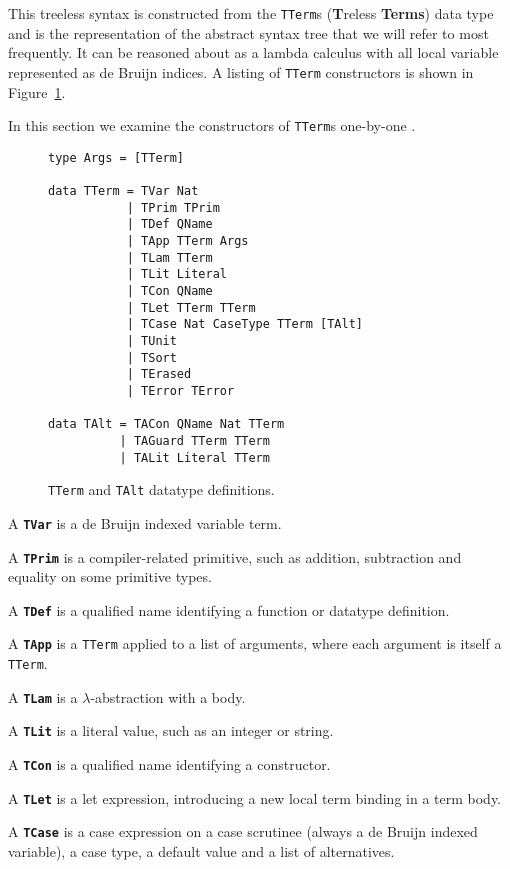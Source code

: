 This treeless syntax is constructed from the \lstinline{TTerm}s (\textbf{T}reless \textbf{Terms}) data type and is the representation of the abstract syntax tree that we will refer to most frequently. It can be reasoned about as a lambda calculus with all local variable represented as de Bruijn indices. A listing of \lstinline{TTerm} constructors is shown in Figure~\ref{code:TTerm}.

In this section we examine the constructors of \lstinline{TTerm}s one-by-one \citep{agdahackage}.

\begin{figure}[h]
\begin{lstlisting}[style=blockhaskell]
type Args = [TTerm]

data TTerm = TVar Nat
           | TPrim TPrim
           | TDef QName
           | TApp TTerm Args
           | TLam TTerm
           | TLit Literal
           | TCon QName
           | TLet TTerm TTerm
           | TCase Nat CaseType TTerm [TAlt]
           | TUnit
           | TSort
           | TErased
           | TError TError

data TAlt = TACon QName Nat TTerm
          | TAGuard TTerm TTerm
          | TALit Literal TTerm
\end{lstlisting}
\caption{\lstinline{TTerm} and \lstinline{TAlt} datatype definitions.}
\label{code:TTerm}
\end{figure}

A \textbf{\lstinline{TVar}} is a de Bruijn indexed variable term.

A \textbf{\lstinline{TPrim}} is a compiler-related primitive, such as addition, subtraction and equality on some primitive types.

A \textbf{\lstinline{TDef}} is a qualified name identifying a function or datatype definition.

A \textbf{\lstinline{TApp}} is a \lstinline{TTerm} applied to a list of arguments, where each argument is itself a \lstinline{TTerm}.

A \textbf{\lstinline{TLam}} is a $\lambda$-abstraction with a body.

A \textbf{\lstinline{TLit}} is a literal value, such as an integer or string.

A \textbf{\lstinline{TCon}} is a qualified name identifying a constructor.

A \textbf{\lstinline{TLet}} is a let expression, introducing a new local term binding in a term body.

A \textbf{\lstinline{TCase}} is a case expression on a case scrutinee (always a de Bruijn indexed variable), a case type, a default value and a list of alternatives.

